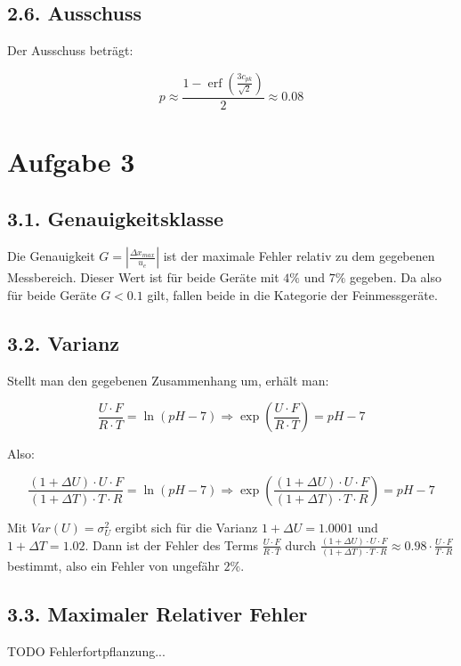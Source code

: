 \documentclass[12pt,a4paper]{article}
\DeclareMathOperator\erf{erf}
\begin{document}
\subsection*{2.6. Ausschuss}
Der Ausschuss beträgt:

\[
p \approx \frac{1 - \erf\left(\frac{3 c_{pk}}{\sqrt{2}}\right)}{2} \approx 0.08
\]

\pagebreak
\section*{Aufgabe 3}
\subsection*{3.1. Genauigkeitsklasse}
Die Genauigkeit $G = \left| \frac{\Delta x_{max}}{u_e} \right|$ ist der maximale Fehler relativ zu dem gegebenen Messbereich. Dieser Wert ist für beide Geräte mit $4\%$ und $7\%$ gegeben. Da also für beide Geräte $G < 0.1$ gilt, fallen beide in die Kategorie der Feinmessgeräte.

\subsection*{3.2. Varianz}
Stellt man den gegebenen Zusammenhang um, erhält man:

\[
\frac{U \cdot F}{R \cdot T} = \ln(pH - 7) \Rightarrow \exp\left(\frac{U \cdot F}{R \cdot T}\right) = pH - 7
\]

Also:

\[
\frac{(1 + \Delta U) \cdot U \cdot F}{(1 + \Delta T) \cdot T \cdot R} = \ln(pH - 7) \Rightarrow \exp\left(\frac{(1 + \Delta U) \cdot U \cdot F}{(1 + \Delta T) \cdot T \cdot R}\right) = pH - 7
\]

Mit $Var(U) = \sigma_U^2$ ergibt sich für die Varianz $1 + \Delta U = 1.0001$ und $1 + \Delta T = 1.02$. Dann ist der Fehler des Terms $\frac{U \cdot F}{R \cdot T}$ durch $\frac{(1 + \Delta U) \cdot U \cdot F}{(1 + \Delta T) \cdot T \cdot R} \approx 0.98 \cdot \frac{U \cdot F}{T \cdot R}$ bestimmt, also ein Fehler von ungefähr $2\%$.

\subsection*{3.3. Maximaler Relativer Fehler}
TODO Fehlerfortpflanzung...
\end{document}
